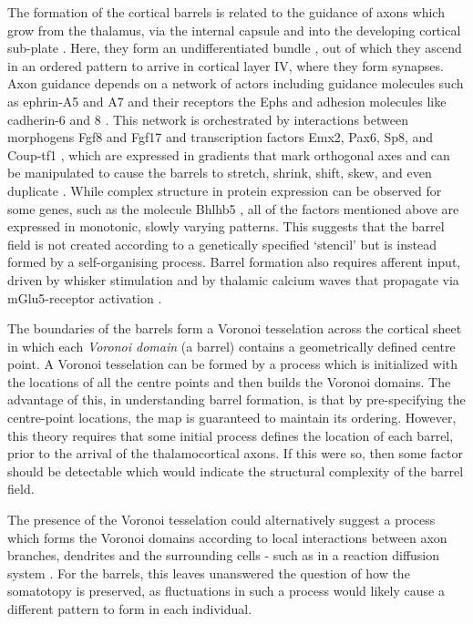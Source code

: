 \documentclass[9pt,twocolumn,twoside,lineno]{pnas-new}
\begin{document}
The formation of the cortical barrels is related to the guidance of axons
which grow from the thalamus, via the internal capsule and into the developing
cortical sub-plate \citep{erzurumlu_development_2012}. Here, they form an
undifferentiated bundle \citep{agmon_organized_1993}, out of which they ascend
in an ordered pattern to arrive in cortical layer IV, where they form
synapses. Axon guidance depends on a network of actors including guidance
molecules such as ephrin-A5 and A7 and their receptors the Ephs
\citep{miller_epha7-ephrin-a5_2006} and adhesion molecules like cadherin-6 and
8 \citep{bishop_regulation_2000}. This network is orchestrated by interactions
between morphogens Fgf8 and Fgf17 and transcription factors Emx2, Pax6, Sp8,
and Coup-tf1 \citep{shimogori_fibroblast_2005,bishop_regulation_2000}, which
are expressed in gradients that mark orthogonal axes and can be manipulated to
cause the barrels to stretch, shrink, shift, skew, and even duplicate
\cite{assimacopoulos_fibroblast_2012}.
%
While complex structure in protein expression can be observed for some genes,
such as the molecule Bhlhb5 \citep{joshi_bhlhb5_2008}, all of the factors
mentioned above are expressed in monotonic, slowly varying patterns. This
suggests that the barrel field is not created according to a genetically
specified `stencil' but is instead formed by a self-organising process.
%
Barrel formation also requires afferent input, driven by whisker stimulation
and by thalamic calcium waves that propagate via mGlu5-receptor activation
\citep{anton-bolanos_prenatal_2019}.

The boundaries of the barrels form a Voronoi tesselation across the cortical
sheet \citep{senft_mouse_1991} in which each \emph{Voronoi domain} (a barrel)
contains a geometrically defined centre point. A Voronoi tesselation can be
formed by a process which is initialized with the locations of all the centre
points and then builds the Voronoi domains. The advantage of this, in
understanding barrel formation, is that by pre-specifying the centre-point
locations, the map is guaranteed to maintain its ordering. However, this
theory requires that some initial process defines the location of each barrel,
prior to the arrival of the thalamocortical axons. If this were so, then some
factor should be detectable which would indicate the structural complexity of
the barrel field.

The presence of the Voronoi tesselation could alternatively suggest a process
which forms the Voronoi domains according to local interactions between axon
branches, dendrites and the surrounding cells - such as in a reaction
diffusion system . For the barrels, this leaves
unanswered the question of how the somatotopy is preserved, as fluctuations in
such a process would likely cause a different pattern to form in each
individual.
\end{document}

